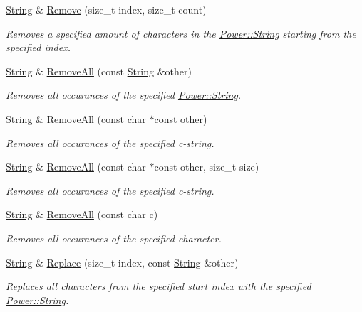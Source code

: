 \begin{DoxyCompactItemize}
\hyperlink{class_power_1_1_string}{String} \& \hyperlink{class_power_1_1_string_a43f1d459afdc0a80c72be214f54f7187}{Remove} (size\+\_\+t index, size\+\_\+t count)
\begin{DoxyCompactList}\small\item\em Removes a specified amount of characters in the \hyperlink{class_power_1_1_string}{Power\+::\+String} starting from the specified index. \end{DoxyCompactList}\item 
\hyperlink{class_power_1_1_string}{String} \& \hyperlink{class_power_1_1_string_a43b649fe2658dc5d81e3c5e245dedc6e}{Remove\+All} (const \hyperlink{class_power_1_1_string}{String} \&other)
\begin{DoxyCompactList}\small\item\em Removes all occurances of the specified \hyperlink{class_power_1_1_string}{Power\+::\+String}. \end{DoxyCompactList}\item 
\hyperlink{class_power_1_1_string}{String} \& \hyperlink{class_power_1_1_string_add8a90782cd07cc66c639c364d828f1b}{Remove\+All} (const char $\ast$const other)
\begin{DoxyCompactList}\small\item\em Removes all occurances of the specified c-\/string. \end{DoxyCompactList}\item 
\hyperlink{class_power_1_1_string}{String} \& \hyperlink{class_power_1_1_string_ae2cc6cb98cef5c977411eed042bd8757}{Remove\+All} (const char $\ast$const other, size\+\_\+t size)
\begin{DoxyCompactList}\small\item\em Removes all occurances of the specified c-\/string. \end{DoxyCompactList}\item 
\hyperlink{class_power_1_1_string}{String} \& \hyperlink{class_power_1_1_string_a64645e19944f9cee21097d33dc704211}{Remove\+All} (const char c)
\begin{DoxyCompactList}\small\item\em Removes all occurances of the specified character. \end{DoxyCompactList}\item 
\hyperlink{class_power_1_1_string}{String} \& \hyperlink{class_power_1_1_string_ab0a52e24022cf0b22d7af6264ecc4c98}{Replace} (size\+\_\+t index, const \hyperlink{class_power_1_1_string}{String} \&other)
\begin{DoxyCompactList}\small\item\em Replaces all characters from the specified start index with the specified \hyperlink{class_power_1_1_string}{Power\+::\+String}. \end{DoxyCompactList}\item 

\end{DoxyCompactItemize}
